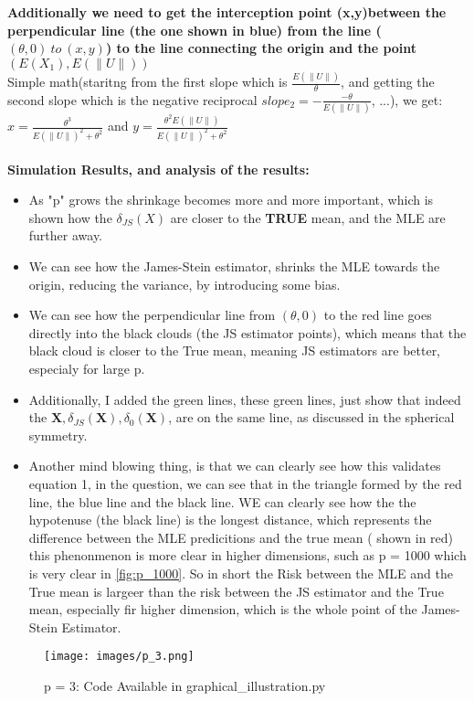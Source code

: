 \documentclass[12pt]{article}
\begin{document}
\textbf{Additionally we need to get the interception point (x,y)between the perpendicular line (the one shown in blue) from the line ($(\theta,0) \ to\  (x,y)$) to the line connecting the origin and the point $(E(X_1), E(\|U\|))$}\\
Simple math(staritng from the first slope which is $\frac{E(\|U\|)}{\theta}$, and getting the second slope which is the negative reciprocal $slope_2 = -\frac{-\theta}{E(\|U\|)}$, ...), we get: $x = \frac{\theta^3}{E(\|U\|)^2+\theta^2}$ and $y = \frac{\theta^2 E(\|U\|)}{E(\|U\|)^2 + \theta^2}$ \\ \\ 
\textbf{Simulation Results, and analysis of the results:} \\
\begin{itemize}
  \item As "p" grows the shrinkage becomes more and more important, which is shown how the $\delta_{JS}(X)$ are closer to the \textbf{TRUE} mean, and the MLE are further away. 
  \item We can see how the James-Stein estimator, shrinks the MLE towards the origin, reducing the variance, by introducing some bias. 
  \item We can see how the perpendicular line from $(\theta,0)$ to the red line goes directly into the black clouds (the JS estimator points), which means that the black cloud is closer to the True mean, meaning JS estimators are better, especialy for large p. 
  \item Additionally, I added the green lines, these green lines, just show that indeed the $\boldsymbol{X}, \delta_{JS}(\boldsymbol{X}), \delta_0(\boldsymbol{X})$, are on the same line, as discussed in the spherical symmetry.
  \item Another mind blowing thing, is that we can clearly see how this validates equation 1, in the question, we can see that in the triangle formed by the red line, the blue line and the black line. WE can clearly see how the the hypotenuse (the black line) is the longest distance, which represents the difference between the MLE predicitions and the true mean ( shown in red) this phenonmenon is more clear in higher dimensions, such as p = 1000 which is very clear in \ref{fig:p_1000}. So in short the Risk between the MLE and the True mean is largeer than the risk between the JS estimator and the True mean, especially fir higher dimension, which is the whole point of the James-Stein Estimator.
\end{itemize}
\begin{figure}[H]
  \centering 
  \texttt{[image: images/p\_3.png]}
  \caption{p = 3: Code Available in graphical\_illustration.py}
  \label{fig:p_3}
\end{figure}
\end{document}
